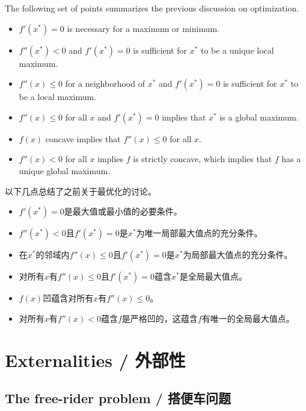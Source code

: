 \begin{original}
The following set of points summarizes the previous discussion on optimization.
\begin{itemize}
\item $f'(x^*) = 0$ is necessary for a maximum or minimum.
\item $f''(x^*) < 0$ and $f'(x^*) = 0$ is sufficient for $x^*$ to be a unique local maximum.
\item $f''(x) \le 0$ for a neighborhood of $x^*$ and $f'(x^*) = 0$ is sufficient for $x^*$ to be a local maximum.
\item $f''(x) \le 0$ for all $x$ and $f'(x^*) = 0$ implies that $x^*$ is a global maximum.
\item $f(x)$ concave implies that $f''(x) \le 0$ for all $x$.
\item $f''(x) < 0$ for all $x$ implies $f$ is strictly concave, which implies that $f$ has a unique global maximum.
\end{itemize}
\end{original}
\begin{translation}
以下几点总结了之前关于最优化的讨论。
\begin{itemize}
\item $f'(x^*) = 0$是最大值或最小值的必要条件。
\item $f''(x^*) < 0$且$f'(x^*) = 0$是$x^*$为唯一局部最大值点的充分条件。
\item 在$x^*$的邻域内$f''(x) \le 0$且$f'(x^*) = 0$是$x^*$为局部最大值点的充分条件。
\item 对所有$x$有$f''(x) \le 0$且$f'(x^*) = 0$蕴含$x^*$是全局最大值点。
\item $f(x)$凹蕴含对所有$x$有$f''(x) \le 0$。
\item 对所有$x$有$f''(x) < 0$蕴含$f$是严格凹的，这蕴含$f$有唯一的全局最大值点。
\end{itemize}
\end{translation}

\section{Externalities / 外部性}

\subsection{The free-rider problem / 搭便车问题}

